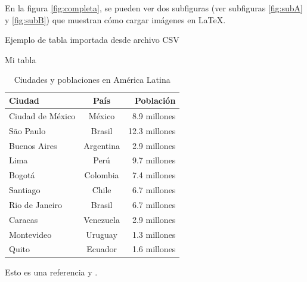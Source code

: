 \documentclass[12pt]{article}
\begin{document}
En la figura \ref{fig:completa}, se pueden ver dos subfiguras (ver subfiguras \ref{fig:subA} y \ref{fig:subB}) que muestran cómo cargar imágenes en LaTeX.

\newpage

\begin{table}[ht]
	\centering
	\caption{Ejemplo de tabla importada desde archivo CSV}
	\label{tab:tabla-importada}
\end{table}

\begin{table}[h]
	\centering
	\caption{Mi tabla}
	\label{tab:mi_tabla}
\end{table}

\begin{table}
	\centering
	\begin{tabular}{l c r}
		\toprule
		Ciudad & País & Población \\
		\midrule
		Ciudad de México & México & 8.9 millones \\
		São Paulo & Brasil & 12.3 millones \\
		Buenos Aires & Argentina & 2.9 millones \\
		Lima & Perú & 9.7 millones \\
		Bogotá & Colombia & 7.4 millones \\
		Santiago & Chile & 6.7 millones \\
		Rio de Janeiro & Brasil & 6.7 millones \\
		Caracas & Venezuela & 2.9 millones \\
		Montevideo & Uruguay & 1.3 millones \\
		Quito & Ecuador & 1.6 millones \\
		\bottomrule
	\end{tabular}
	\caption{Ciudades y poblaciones en América Latina}
	\label{tab:ciudades_poblaciones}
\end{table}

\newpage

Esto es una referencia \textcite{ArgosyMedicalAnimation} y \parencite{Bockarjova2020}.


\printbibliography
\end{document}
